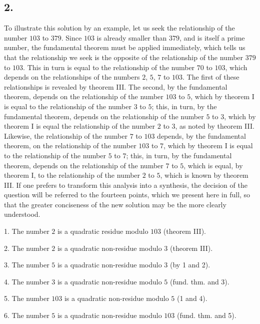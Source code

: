 \documentclass[twoside,12pt]{memoir}
\begin{document}
\subsection*{2.}

To illustrate this solution by an example, let us seek the relationship of the number \(103\) to \(379\). Since \(103\) is already smaller than \(379\), and is itself a prime number, the fundamental theorem must be applied immediately, which tells us that the relationship we seek is the opposite of the relationship of the number \(379\) to \(103\). This in turn is equal to the relationship of the number \(70\) to \(103\), which depends on the relationships of the numbers \(2\), \(5\), \(7\) to \(103\). The first of these relationships is revealed by theorem III. The second, by the fundamental theorem, depends on the relationship of the number \(103\) to \(5\), which by theorem I is equal to the relationship of the number \(3\) to \(5\); this, in turn, by the fundamental theorem, depends on the relationship of the number \(5\) to \(3\), which by theorem I is equal the relationship of the number \(2\) to \(3\), as noted by theorem III. Likewise, the relationship of the number \(7\) to \(103\) depends, by the fundamental theorem, on the relationship of the number \(103\) to \(7\), which by theorem I is equal to the relationship of the number \(5\) to \(7\); this, in turn, by the fundamental theorem, depends on the relationship of the number \(7\) to \(5\), which is equal, by theorem I, to the relationship of the number \(2\) to \(5\), which is known by theorem III. If one prefers to transform this analysis into a synthesis, the decision of the question will be referred to the fourteen points, which we present here in full, so that the greater conciseness of the new solution may be the more clearly understood.
%

1. The number \(2\) is a quadratic residue modulo \(103\) (theorem III).
    
2. The number \(2\) is a quadratic non-residue modulo \(3\) (theorem III).
    
3. The number \(5\) is a quadratic non-residue modulo \(3\) (by 1 and 2).
    
4. The number \(3\) is a quadratic non-residue modulo \(5\) (fund{.} thm{.} and 3).
    
5. The number \(103\) is a quadratic non-residue modulo \(5\) (1 and 4).
    
6. The number \(5\) is a quadratic non-residue modulo \(103\) (fund{.} thm{.} and 5).
    
\end{document}
